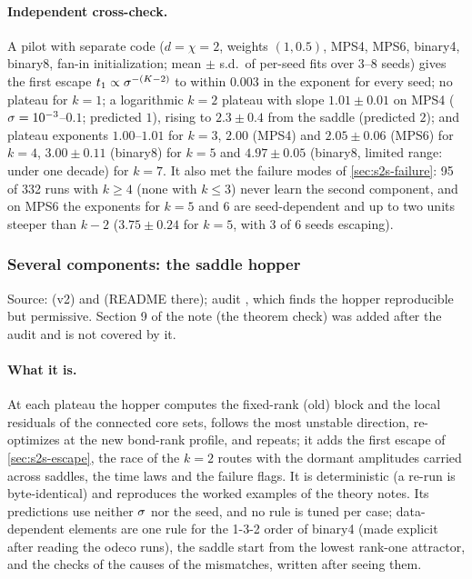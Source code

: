 \paragraph{Independent cross-check.}
\empirical{} A pilot with separate code ($d=\chi=2$, weights $(1,0.5)$, MPS4, MPS6, binary4, binary8, fan-in
initialization; mean $\pm$ s.d.\ of per-seed fits over 3--8 seeds) gives the first escape $t_{1}\propto\sigma^{-(K-2)}$
to within $0.003$ in the exponent for every seed; no plateau for $k=1$; a logarithmic $k=2$ plateau with slope
$1.01\pm0.01$ on MPS4 ($\sigma=10^{-3}$--$0.1$; predicted $1$), rising to $2.3\pm0.4$ from the saddle (predicted $2$);
and plateau exponents $1.00$--$1.01$ for $k=3$, $2.00$ (MPS4) and $2.05\pm0.06$ (MPS6) for $k=4$, $3.00\pm0.11$ (binary8) for $k=5$
and $4.97\pm0.05$ (binary8, limited range: under one decade) for $k=7$. It also met the failure modes of
\cref{sec:s2s-failure}: 95 of 332 runs with $k\ge4$ (none with $k\le3$) never learn the second component, and on
MPS6 the exponents for $k=5$ and $6$ are seed-dependent and up to two units steeper than $k-2$ ($3.75\pm0.24$ for
$k=5$, with 3 of 6 seeds escaping).

\subsubsection{Several components: the saddle hopper}\label{app:supp-s2s-hopper}
Source:  (v2) and  (README there); audit
, which finds the hopper reproducible but permissive. Section 9 of the
note (the theorem check) was added after the audit and is not covered by it.

\paragraph{What it is.}
At each plateau the hopper computes the fixed-rank (old) block and the local residuals of the connected core sets,
follows the most unstable direction, re-optimizes at the new bond-rank profile, and repeats; it adds the first escape
of \cref{sec:s2s-escape}, the race of the $k=2$ routes with the dormant amplitudes carried across saddles, the time
laws and the failure flags. It is deterministic (a re-run is byte-identical) and reproduces the worked examples of
the theory notes. Its predictions use neither $\sigma$ nor the seed, and no rule is tuned per case; data-dependent
elements are one rule for the 1-3-2 order of binary4 (made explicit after reading the odeco runs), the saddle start
from the lowest rank-one attractor, and the checks of the causes of the mismatches, written after seeing them.

